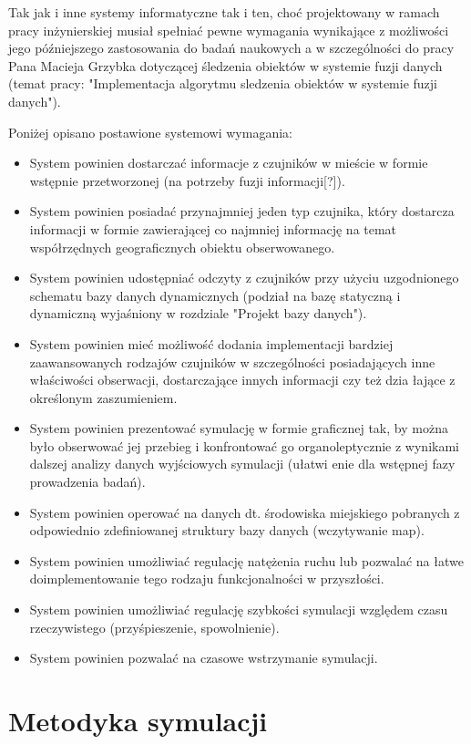 \par{
Tak jak i inne systemy informatyczne tak i ten, choć projektowany w ramach pracy inżynierskiej musiał spełniać pewne wymagania wynikające z możliwości jego późniejszego zastosowania do badań naukowych a w szczególności do pracy Pana Macieja Grzybka dotyczącej śledzenia obiektów w systemie fuzji danych (temat pracy: "Implementacja algorytmu sledzenia obiektów w systemie fuzji danych").
}
\par{
Poniżej opisano postawione systemowi wymagania:
\begin{itemize}
	\item System powinien dostarczać informacje z czujników w mieście w formie wstępnie przetworzonej (na potrzeby fuzji informacji[?]).
	\item System powinien posiadać przynajmniej jeden typ czujnika, który dostarcza informacji w formie zawierającej co najmniej informację na temat współrzędnych geograficznych obiektu obserwowanego.
	\item System powinien udostępniać odczyty z czujników przy użyciu uzgodnionego schematu bazy danych dynamicznych (podział na bazę statyczną i dynamiczną wyjaśniony w rozdziale "Projekt bazy danych").
	\item System powinien mieć możliwość dodania implementacji bardziej zaawansowanych rodzajów czujników w szczególności posiadających inne właściwości obserwacji, dostarczające innych informacji czy też dzia    łające z określonym zaszumieniem.
	\item System powinien prezentować symulację w formie graficznej tak, by można było obserwować jej przebieg i konfrontować go organoleptycznie z wynikami dalszej analizy danych wyjściowych symulacji (ułatwi    enie dla wstępnej fazy prowadzenia badań).
	\item System powinien operować na danych dt. środowiska miejskiego pobranych z odpowiednio zdefiniowanej struktury bazy danych (wczytywanie map).
	\item System powinien umożliwiać regulację natężenia ruchu lub pozwalać na łatwe doimplementowanie tego rodzaju funkcjonalności w przyszłości.
	\item System powinien umożliwiać regulację szybkości symulacji względem czasu rzeczywistego (przyśpieszenie, spowolnienie).
	\item System powinien pozwalać na czasowe wstrzymanie symulacji.
\end{itemize}
}

\section[Metodyka symulacji][Metodyka symulacji]{Metodyka symulacji}
